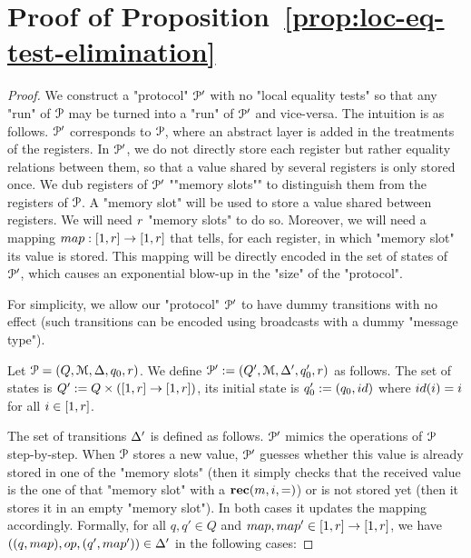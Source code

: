 \section{Proof of Proposition~\ref{prop:loc-eq-test-elimination}}
\label{sec:proof-lol-eq-test-elim}

\SimpleReduction*

\begin{proof}
	We construct a "protocol" $\mathcal{P}'$ with no "local equality tests" so that any "run" of $\mathcal{P}$ may be turned into a "run" of $\mathcal{P}'$ and vice-versa. 
	The intuition is as follows. $\mathcal{P}'$ corresponds to $\mathcal{P}$, where an abstract layer is added in the treatments of the registers. In $\mathcal{P}'$, we do not directly store each register but rather equality relations between them, so that a value shared by several registers is only stored once. We dub registers of $\mathcal{P}'$ ""memory slots"" to distinguish them from the registers of $\mathcal{P}$. A "memory slot" will be used to store a value shared between registers. 
	We will need $r$ "memory slots" to do so. Moreover, we will need a mapping $\map : \nset{1}{r} \to \nset{1}{r}$ that tells, for each register, in which "memory slot" its value is stored. This mapping will be directly encoded in the set of states of $\mathcal{P}'$, which causes an exponential blow-up in the "size" of the "protocol".
	
	For simplicity, we allow our "protocol" $\mathcal{P}'$ to have dummy transitions with no effect (such transitions can be encoded using broadcasts with a dummy "message type"). 
	
	Let $\mathcal{P} = (Q, \mathcal{M}, \Delta, q_0, r)$. 
	We define $\mathcal{P}' := (Q', \mathcal{M}, \Delta', q_0', r)$ as follows. The set of states is $Q' := Q \times ([1,r] \to [1,r])$, its initial state is $q_0' := (q_0, \idmap)$ where $\idmap(i) = i$ for all $i \in [1,r]$. 
	
	The set of transitions $\Delta'$ is defined as follows.
	$\mathcal{P}'$ mimics the operations of $\mathcal{P}$ step-by-step. When $\mathcal{P}$ stores a new value, $\mathcal{P}'$ guesses whether this value is already stored in one of the "memory slots" (then it simply checks that the received value is the one of that "memory slot" with a $\textbf{rec}(m, i, {=})$) or is not stored yet (then it stores it in an empty "memory slot"). In both cases it updates the mapping accordingly.
	Formally, for all $q,q' \in Q$ and $\map, \map' \in \nset{1}{r} \to \nset{1}{r}$, we have $((q, \map), \op, (q', \map')) \in \transitions'$ in the following cases:
	

\end{proof}

